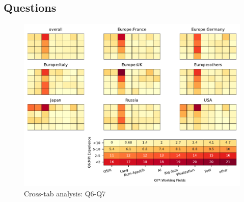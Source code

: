 
\subsection{Questions}


\begin{figure}
\begin{center}
\includegraphics[width=12cm]{../pdfs/Q6-Q7.pdf}
\caption{Cross-tab analysis: Q6-Q7}
\label{fig:Q6-Q7}
\end{center}
\end{figure}
